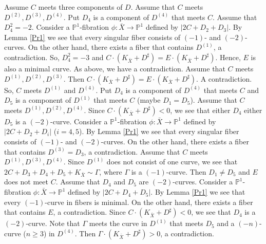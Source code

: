 \documentclass[10pt,oneside,reqno]{amsart}
\newcommand{\pp}{\mathbb{P}}
\theoremstyle{definition}
\theoremstyle{remark}
\numberwithin{equation}{section}
\begin{document}
Assume $C$ meets three components of $D$. Assume that $C$ meets $D^{(2)},D^{(3)},D^{(4)}$. Put $D_4$ is a component of $D^{(4)}$ that meets $C$. Assume that $D^2_4=-2$. Consider a $\pp^1$-fibration $\phi\colon\bar{X}\rightarrow\pp^1$ defined by $|2C+D_2+D_3|$. By Lemma \ref{Pr1} we see that every singular fiber consists of $(-1)$- and $(-2)$-curves. On the other hand, there exists a fiber that contains $D^{(1)}$, a contradiction. So, $D_4^2=-3$ and $C\cdot(K_{\bar{X}}+D^{\sharp})=E\cdot(K_{\bar{X}}+D^{\sharp})$. Hence, $E$ is also a minimal curve. As above, we have a contradiction. Assume that $C$ meets $D^{(1)},D^{(2)},D^{(3)}$. Then $C\cdot(K_{\bar{X}}+D^{\sharp})=E\cdot(K_{\bar{X}}+D^{\sharp})$. A contradiction. So, $C$ meets $D^{(1)}$ and $D^{(4)}$. Put $D_4$ is a component of $D^{(4)}$ that meets $C$ and $D_5$ is a component of $D^{(1)}$ that meets $C$ (maybe $D_1=D_5$). Assume that $C$ meets $D^{(1)},D^{(2)},D^{(4)}$. Since $C\cdot(K_{\bar{X}}+D^{\sharp})<0$, we see that either $D_4$ either $D_5$ is a $(-2)$-curve. Consider a $\pp^1$-fibration $\phi\colon\bar{X}\rightarrow\pp^1$ defined by $|2C+D_2+D_i|$ ($i=4,5$). By Lemma \ref{Pr1} we see that every singular fiber consists of $(-1)$- and $(-2)$-curves. On the other hand, there exists a fiber that contains $D^{(3)}=D_3$, a contradiction. Assume that $C$ meets $D^{(1)},D^{(3)},D^{(4)}$. Since $D^{(1)}$ does not consist of one curve, we see that $2C+D_3+D_4+D_5+K_{\bar{X}}\sim\Gamma$, where $\Gamma$ is a $(-1)$-curve. Then $D_1\neq D_5$ and $E$ does not meet $C$. Assume that $D_4$ and $D_5$ are $(-2)$-curves. Consider a $\pp^1$-fibration $\phi\colon\bar{X}\rightarrow\pp^1$ defined by $|2C+D_4+D_5|$. By Lemma \ref{Pr1} we see that every $(-1)$-curve in fibers is minimal. On the other hand, there exists a fiber that contains $E$, a contradiction. Since $C\cdot(K_{\bar{X}}+D^{\sharp})<0$, we see that $D_4$ is a $(-2)$-curve. Note that $\Gamma$ meets the curve in $D^{(1)}$ that meets $D_5$ and a $(-n)$-curve ($n\geq 3$) in $D^{(4)}$. Then $\Gamma\cdot(K_{\bar{X}}+D^{\sharp})>0$, a contradiction.
\end{document}
